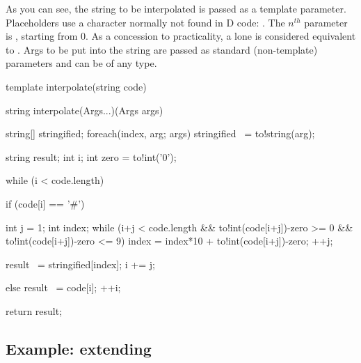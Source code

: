 
As you can see, the string to be interpolated is passed as a template parameter. Placeholders use a character normally not found in D code: \DD{\#}. The $n^{th}$ parameter is , starting from 0. As a concession to practicality, a lone \DD{\#} is considered equivalent to . Args to be put into the string are passed as standard (non-template) parameters and can be of any type.

\begin{dcode}
template interpolate(string code)
{
    string interpolate(Args...)(Args args) {
        string[] stringified;
        foreach(index, arg; args) stringified ~= to!string(arg);

        string result;
        int i;
        int zero = to!int('0');

        while (i < code.length) {
            if (code[i] == '#') {
                int j = 1;
                int index;
                while (i+j < code.length
                    && to!int(code[i+j])-zero >= 0
                    && to!int(code[i+j])-zero <= 9)
                {
                    index = index*10 + to!int(code[i+j])-zero;
                    ++j;
                }

                result ~= stringified[index];
                i += j;
            }
            else {
                result ~= code[i];
                ++i;
            }
        }

        return result;
    }
}
\end{dcode}


\subsection{Example: extending }\label{naryfun}

